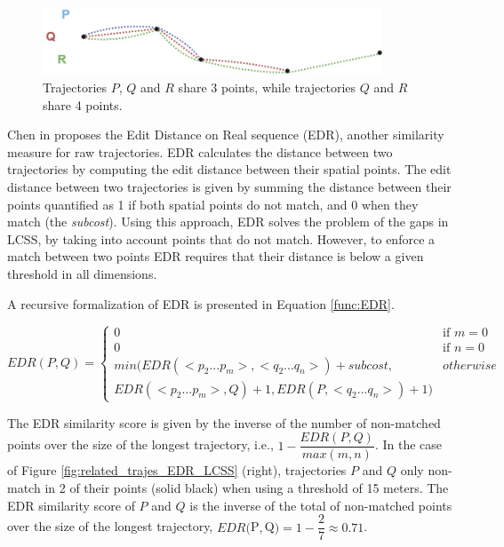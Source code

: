 \documentclass[12pt]{article}
\begin{document}
\begin{figure}[h]
\centering
\includegraphics[width=0.9\textwidth]{Related_Works/related_trajes_PQR.jpg}
\caption{\label{fig:related_trajes_PQR}Trajectories $P$, $Q$ and $R$ share 3 points, while trajectories $Q$ and $R$ share 4 points.}
\end{figure}


Chen in \cite{Chen:2005:RFS:1066157.1066213} proposes the Edit Distance on Real sequence (EDR), another similarity measure for raw trajectories. EDR calculates the distance between two trajectories by computing the edit distance between their spatial points. The edit distance between two trajectories is given by summing the distance between their points quantified as 1 if both spatial points do not match, and 0 when they match (the \emph{subcost}). Using this approach, EDR solves the problem of the gaps in LCSS, by taking into account points that do not match. However, to enforce a match between two points EDR requires that their distance is below a given threshold in all dimensions.

A recursive  formalization of EDR is presented in Equation \ref{func:EDR}.

\begin{equation}
\label{func:EDR}
  EDR(P, Q) = 
  \begin{cases} 
      0 & \text{if } m = 0\\ 
      0 & \text{if } n = 0\\ 
      min(EDR(<p_2...p_m>,<q_2...q_n>) + subcost, & otherwise\\
      EDR(<p_2...p_m>, Q) + 1, EDR(P, <q_2...q_n>) + 1) &
  \end{cases}
\end{equation}

The EDR similarity score is given by the inverse of the number of non-matched points over the size of the longest trajectory, i.e., $1 - \dfrac{EDR(P, Q)}{max(m, n)}$. In the case of Figure \ref{fig:related_trajes_EDR_LCSS} (right), trajectories $P$ and $Q$ only non-match in 2 of their points (solid black) when using a threshold of 15 meters. The EDR similarity score of $P$ and $Q$ is the inverse of the total of non-matched points over the size of the longest trajectory, $EDR($P$, $Q$) = 1 - \dfrac{2}{7} \approx 0.71$.
\end{document}
